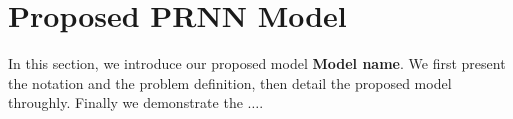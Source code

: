 
\section{Proposed PRNN Model}


In this section, we introduce our proposed model \textbf{Model name}.
%
We first present the notation and the problem definition, then detail the
proposed model throughly.
%
Finally we demonstrate the $\dots{}$.




